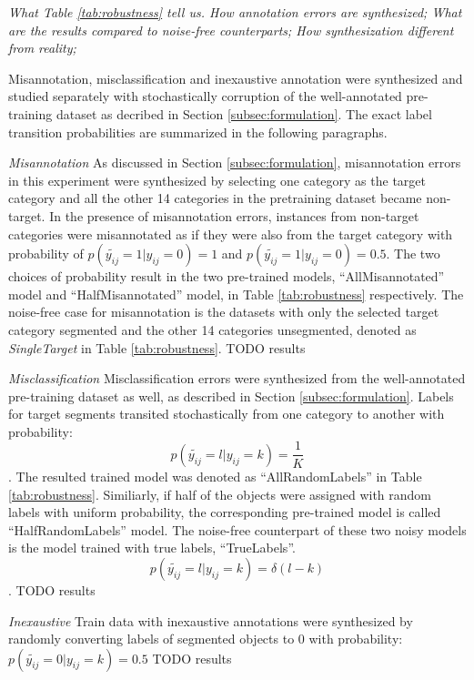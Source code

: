\noindent \textit{What Table \ref{tab:robustness} tell us.
How annotation errors are synthesized;
What are the results compared to noise-free counterparts;
How synthesization different from reality;
}

\noindent
Misannotation, misclassification and inexaustive annotation were synthesized and studied separately with stochastically corruption of the well-annotated pre-training dataset as decribed in Section \ref{subsec:formulation}.
The exact label transition probabilities are summarized in the following paragraphs.

\noindent \textit{Misannotation}
\noindent
As discussed in Section \ref{subsec:formulation}, misannotation errors in this experiment were synthesized by selecting one category as the target category and all the other 14 categories in the pretraining dataset became non-target.
In the presence of misannotation errors, instances from non-target categories were misannotated as if they were also from the target category with probability of $p(\tilde{y_{ij}}=1 \vert y_{ij}=0) = 1$ and $p(\tilde{y_{ij}}=1 \vert y_{ij}=0) = 0.5$.
The two choices of probability result in the two pre-trained models, ``AllMisannotated'' model and ``HalfMisannotated'' model, in Table \ref{tab:robustness} respectively.
The noise-free case for misannotation is the datasets with only the selected target category segmented and the other 14 categories unsegmented, denoted as \textit{SingleTarget} in Table \ref{tab:robustness}.
{TODO results}

\noindent \textit{Misclassification}
\noindent
Misclassification errors were synthesized from the well-annotated pre-training dataset as well, as described in Section \ref{subsec:formulation}.
Labels for target segments transited stochastically from one category to another with probability:
$$p(\tilde{y_{ij}}=l \vert y_{ij}=k) = \frac{1}{K}$$.
The resulted trained model was denoted as ``AllRandomLabels'' in Table \ref{tab:robustness}.
Similiarly, if half of the objects were assigned with random labels with uniform probability, the corresponding pre-trained model is called ``HalfRandomLabels'' model.
The noise-free counterpart of these two noisy models is the model trained with true labels, ``TrueLabels''.
$$p(\tilde{y_{ij}}=l \vert y_{ij}=k) = \delta(l-k)$$.
{TODO results}

\noindent \textit{Inexaustive}
\noindent
Train data with inexaustive annotations were synthesized by randomly converting labels of segmented objects to 0 with probability:
$p(\tilde{y_{ij}}=0 \vert y_{ij}=k) = 0.5$
{TODO results}

